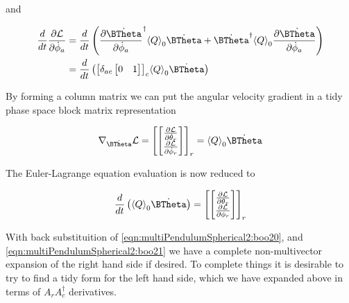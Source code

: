and

\begin{align*}
\frac{d}{dt} \PD{\dot{\phi}_a}{\LL}
&=
\frac{d}{dt} 
\left(
\PD{\dot{\phi}_a}{\dot{\BTheta}}^\dagger
\gpgradezero{Q} 
\dot{\BTheta}
+
\dot{\BTheta}^\dagger
\gpgradezero{Q} 
\PD{\dot{\phi}_a}{\dot{\BTheta}}
\right)  \\
&=
\frac{d}{dt} \left(
{\begin{bmatrix}
\delta_{ac}
\begin{bmatrix}
0 & 1
\end{bmatrix}
\end{bmatrix}}_c
\gpgradezero{Q} 
\dot{\BTheta}
\right) 
\end{align*}

By forming a column matrix we can put the angular velocity gradient in a tidy phase space block matrix representation

\begin{align}\label{eqn:multiPendulumSpherical2:boo22}
\grad_{\dot{\BTheta}} \LL = 
{\begin{bmatrix}
\begin{bmatrix}
\PD{\dot{\theta}_r}{\LL} \\
\PD{\dot{\phi}_r}{\LL} \\
\end{bmatrix}
\end{bmatrix}}_r = \gpgradezero{Q} \dot{\BTheta}
\end{align}

The Euler-Lagrange equation evaluation is now reduced to

\begin{align}\label{eqn:multiPendulumSpherical2:boo23}
\frac{d}{dt} \left( \gpgradezero{Q} \dot{\BTheta} \right) =
{\begin{bmatrix}
\begin{bmatrix}
\PD{\theta_r}{\LL} \\
\PD{\phi_r}{\LL} \\
\end{bmatrix}
\end{bmatrix}}_r
\end{align}

With back substituition of \ref{eqn:multiPendulumSpherical2:boo20}, and \ref{eqn:multiPendulumSpherical2:boo21} we have a complete non-multivector expansion of the right hand side if desired.  To complete things it is desirable to try to find a tidy form for the left hand side, which we have expanded above in terms of $A_r A_c^\dagger$ derivatives.

